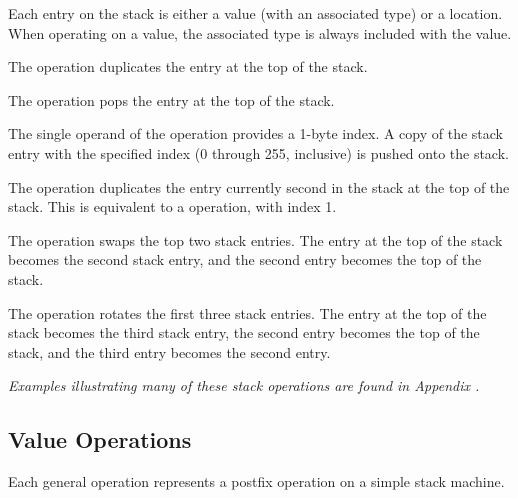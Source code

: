 Each entry on the stack is either a value (with an associated type) or
a location. When operating on a value, the associated type is always
included with the value.

\begin{enumerate}[1. ]
\itembfnl{\DWOPdupTARG}
The \DWOPdupNAME{} operation duplicates the entry at the top of the
stack.

\itembfnl{\DWOPdropTARG}
The \DWOPdropNAME{} operation pops the entry at the top of the stack.

\itembfnl{\DWOPpickTARG}
The single operand of the \DWOPpickNAME{} operation provides a 1-byte
index. A copy of the stack entry with the specified index (0 through
255, inclusive) is pushed onto the stack.

\itembfnl{\DWOPoverTARG}
The \DWOPoverNAME{} operation duplicates the entry currently second in
the stack at the top of the stack.  This is equivalent to a
\DWOPpick{} operation, with index 1.

\itembfnl{\DWOPswapTARG}
The \DWOPswapNAME{} operation swaps the top two stack entries.  The
entry at the top of the stack becomes the second stack entry, and the
second entry becomes the top of the stack.

\itembfnl{\DWOProtTARG}
The \DWOProtNAME{} operation rotates the first three stack
entries. The entry at the top of the stack becomes the third stack
entry, the second entry becomes the top of the stack, and the third
entry becomes the second entry.
\end{enumerate}

\textit{Examples illustrating many of these stack operations are
found in Appendix .}


\subsection{Value Operations}
\label{chap:valueoperations}
Each general operation represents a postfix operation on
a simple stack machine.

